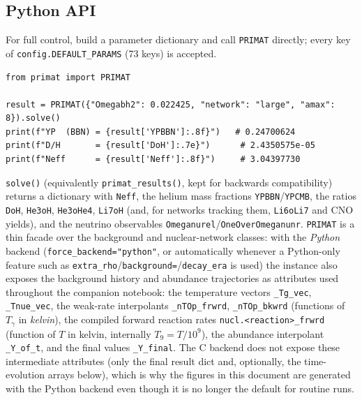 \documentclass[11pt,a4paper]{article}
\newcommand{\Tg}{T_\gamma}
\newcommand{\code}[1]{\texttt{#1}}
\begin{document}
\subsection{Python API}
For full control, build a parameter dictionary and call \code{PRIMAT}
directly; every key of \code{config.DEFAULT\_PARAMS} (73 keys) is accepted.
\begin{lstlisting}[style=py]
from primat import PRIMAT

result = PRIMAT({"Omegabh2": 0.022425, "network": "large", "amax": 8}).solve()
print(f"YP  (BBN) = {result['YPBBN']:.8f}")   # 0.24700624
print(f"D/H       = {result['DoH']:.7e}")      # 2.4350575e-05
print(f"Neff      = {result['Neff']:.8f}")     # 3.04397730
\end{lstlisting}
\code{solve()} (equivalently \code{primat\_results()}, kept for backwards
compatibility) returns a dictionary with \code{Neff}, the helium mass
fractions \code{YPBBN}/\code{YPCMB}, the ratios \code{DoH}, \code{He3oH},
\code{He3oHe4}, \code{Li7oH} (and, for networks tracking them, \code{Li6oLi7}
and CNO yields), and the neutrino observables
\code{Omeganurel}/\code{OneOverOmeganunr}. \code{PRIMAT} is a thin facade over
the background and nuclear-network classes: with the \emph{Python} backend
(\code{force\_backend="python"}, or automatically whenever a Python-only
feature such as \code{extra\_rho}/\code{background=}/\code{decay\_era} is
used) the instance also exposes the background history and abundance
trajectories as attributes used throughout the companion notebook: the
temperature vectors \code{\_Tg\_vec}, \code{\_Tnue\_vec}, the weak-rate
interpolants \code{\_nTOp\_frwrd}, \code{\_nTOp\_bkwrd} (functions of $\Tg$ in
\emph{kelvin}), the compiled forward reaction rates
\code{nucl.<reaction>\_frwrd} (function of $T$ in kelvin, internally
$T_9=T/10^9$), the abundance interpolant \code{\_Y\_of\_t}, and the final
values \code{\_Y\_final}. The C backend does not expose these
intermediate attributes (only the final result dict and, optionally, the
time-evolution arrays below), which is why the figures in this document are
generated with the Python backend even though it is no longer the default
for routine runs.
\end{document}
